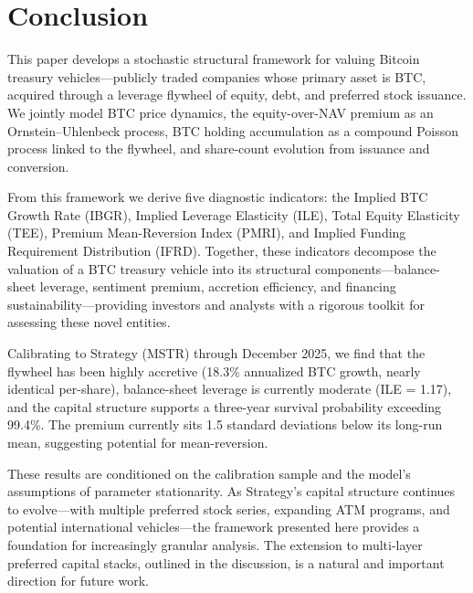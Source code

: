 \section{Conclusion}
\label{sec:conclusion}

This paper develops a stochastic structural framework for valuing Bitcoin treasury vehicles---publicly traded companies whose primary asset is BTC, acquired through a leverage flywheel of equity, debt, and preferred stock issuance. We jointly model BTC price dynamics, the equity-over-NAV premium as an Ornstein--Uhlenbeck process, BTC holding accumulation as a compound Poisson process linked to the flywheel, and share-count evolution from issuance and conversion.

From this framework we derive five diagnostic indicators: the Implied BTC Growth Rate (IBGR), Implied Leverage Elasticity (ILE), Total Equity Elasticity (TEE), Premium Mean-Reversion Index (PMRI), and Implied Funding Requirement Distribution (IFRD). Together, these indicators decompose the valuation of a BTC treasury vehicle into its structural components---balance-sheet leverage, sentiment premium, accretion efficiency, and financing sustainability---providing investors and analysts with a rigorous toolkit for assessing these novel entities.

Calibrating to Strategy (MSTR) through December 2025, we find that the flywheel has been highly accretive (18.3\% annualized BTC growth, nearly identical per-share), balance-sheet leverage is currently moderate (ILE = 1.17), and the capital structure supports a three-year survival probability exceeding 99.4\%. The premium currently sits 1.5 standard deviations below its long-run mean, suggesting potential for mean-reversion.

These results are conditioned on the calibration sample and the model's assumptions of parameter stationarity. As Strategy's capital structure continues to evolve---with multiple preferred stock series, expanding ATM programs, and potential international vehicles---the framework presented here provides a foundation for increasingly granular analysis. The extension to multi-layer preferred capital stacks, outlined in the discussion, is a natural and important direction for future work.
